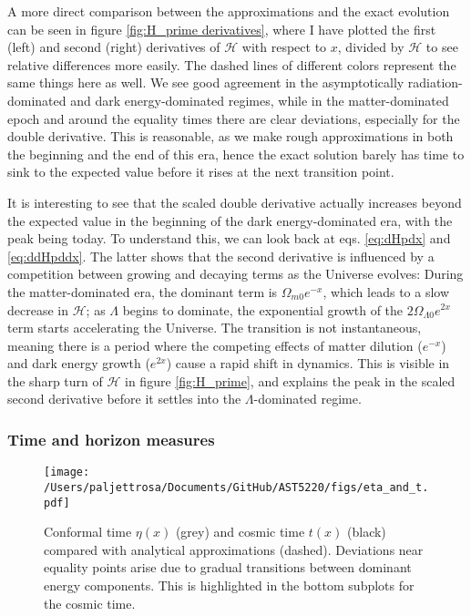 \documentclass{aa}
\begin{document}
A more direct comparison between the approximations and the exact evolution can be seen in figure \ref{fig:H_prime derivatives}, where I have plotted the first (left) and second (right) derivatives of $\mathcal{H}$ with respect to $x$, divided by $\mathcal{H}$ to see relative differences more easily. The dashed lines of different colors represent the same things here as well. We see good agreement in the asymptotically radiation-dominated and dark energy-dominated regimes, while in the matter-dominated epoch and around the equality times there are clear deviations, especially for the double derivative. This is reasonable, as we make rough approximations in both the beginning and the end of this era, hence the exact solution barely has time to sink to the expected value before it rises at the next transition point. 

It is interesting to see that the scaled double derivative actually increases beyond the expected value in the beginning of the dark energy-dominated era, with the peak being today. To understand this, we can look back at eqs. \eqref{eq:dHpdx} and \eqref{eq:ddHpddx}. The latter shows that the second derivative is influenced by a competition between growing and decaying terms as the Universe evolves: During the matter-dominated era, the dominant term is $\Omega_{m0} e^{-x}$, which leads to a slow decrease in $\mathcal{H}$; as $\Lambda$ begins to dominate, the exponential growth of the $2\Omega_{\Lambda 0} e^{2x}$ term starts accelerating the Universe. The transition is not instantaneous, meaning there is a period where the competing effects of matter dilution ($e^{-x}$) and dark energy growth ($e^{2x}$) cause a rapid shift in dynamics. This is visible in the sharp turn of $\mathcal{H}$ in figure \ref{fig:H_prime}, and explains the peak in the scaled second derivative before it settles into the $\Lambda$-dominated regime.


\subsubsection{Time and horizon measures}
\begin{figure*}
  \centering
  \texttt{[image: /Users/paljettrosa/Documents/GitHub/AST5220/figs/eta\_and\_t.pdf]}
  \caption{Conformal time $\eta(x)$ (grey) and cosmic time $t(x)$ (black) compared with analytical approximations (dashed). Deviations near equality points arise due to gradual transitions between dominant energy components. This is highlighted in the bottom subplots for the cosmic time.}\label{fig:eta and t}
\end{figure*}
\end{document}
